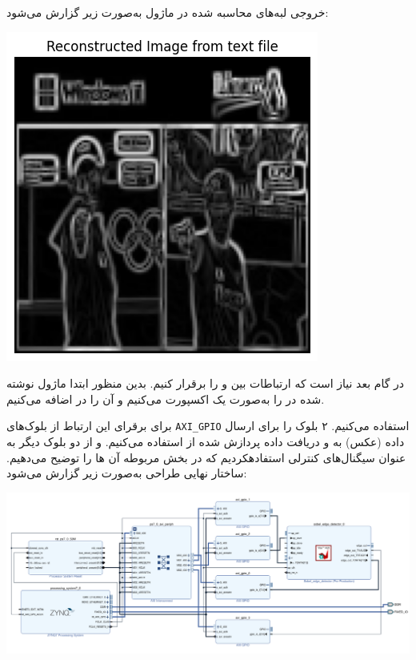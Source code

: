 \begin{qsolve}
	خروجی لبه‌های محاسبه شده در ماژول  به‌صورت زیر گزارش می‌شود:
	
	\begin{center}
		\includegraphics*[width=0.5\linewidth]{pics/img23.png}
		\label{لبه‌های پیدا شده در HLS}
	\end{center}
	
	در گام بعد نیاز است که ارتباطات بین  و  را برقرار کنیم. بدین منظور ابتدا ماژول نوشته شده در  را به‌صورت یک  اکسپورت می‌کنیم و آن را در  اضافه می‌کنیم.
	
	برای برقرای این ارتباط از بلوک‌های \texttt{AXI\_GPIO} استفاده می‌کنیم. ۲ بلوک را برای ارسال داده (عکس) به  و دریافت داده پردازش شده از  استفاده می‌کنیم. و از دو بلوک دیگر به عنوان سیگنال‌های کنترلی استفادهکردیم که در بخش مربوطه آن ها را توضیح می‌دهیم. ساختار نهایی طراحی به‌صورت زیر گزارش می‌شود:
\end{qsolve}



\begin{qsolve}
	\begin{center}
		\includegraphics*[width=1\linewidth]{pics/img24.png}
		\label{دیاگرام طراحی شده برای ارتباط PL و PS}
	\end{center}
\end{qsolve}

